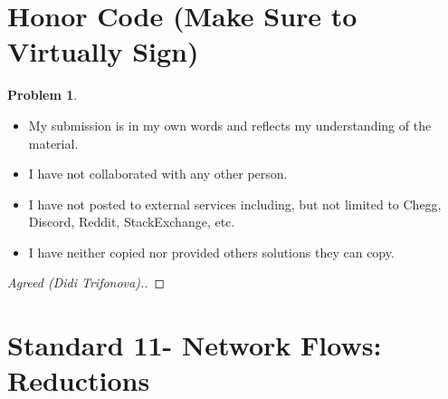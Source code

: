 \documentclass[11pt]{article}
\theoremstyle{definition}
\theoremstyle{definition}
\newtheorem{required}{Problem}
\theoremstyle{definition}
\begin{document}
\section{Honor Code (Make Sure to Virtually Sign)} \label{HonorCode}

\begin{required}
\noindent 
\begin{itemize}
\item My submission is in my own words and reflects my understanding of the material.
\item I have not collaborated with any other person.
\item I have not posted to external services including, but not limited to Chegg, Discord, Reddit, StackExchange, etc.
\item I have neither copied nor provided others solutions they can copy.
\end{itemize}

\end{required}

\begin{proof}[Agreed (Didi Trifonova).]
\end{proof}

\newpage
\section{Standard 11- Network Flows: Reductions}
\end{document}
